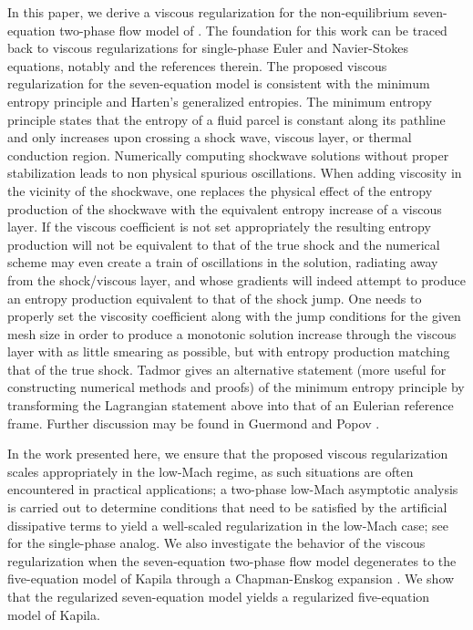 In this paper, we derive a viscous regularization for the non-equilibrium seven-equation two-phase flow model of \cite{SEM}. The foundation for this work 
can be traced back to viscous regularizations for single-phase Euler and Navier-Stokes equations, notably \cite{jlg} and the references therein. 
The proposed viscous regularization for the seven-equation model is consistent with the minimum entropy principle and Harten's generalized 
entropies. 
The minimum entropy principle states that the entropy of a fluid parcel is constant along its pathline
and only increases upon crossing a shock wave, viscous layer, or thermal conduction region.  Numerically computing 
shockwave solutions without proper stabilization leads to non physical spurious oscillations. When adding viscosity in the vicinity 
of the shockwave, one replaces the physical effect of the entropy production of the shockwave with the equivalent entropy increase of a viscous layer.  
If the viscous coefficient is not set appropriately 
the resulting entropy production will not be equivalent to that of the true shock and the numerical scheme %
may even create a train of 
oscillations in the solution, radiating away from the shock/viscous layer, and whose gradients will indeed attempt to produce an entropy production equivalent 
to that of the shock jump. One needs to properly set the viscosity coefficient along with the jump conditions for the given mesh size in order 
to produce a monotonic solution increase through the viscous layer with as little smearing as possible, but with entropy production matching that of the true shock.
Tadmor \cite{tadmor_minimum_entropy_principle} gives an alternative statement (more useful for constructing numerical methods and proofs) of the minimum 
entropy principle by transforming the Lagrangian statement above into that of an Eulerian reference frame. Further discussion may be found in Guermond and Popov \cite{jlg}.

In the work presented here, we ensure that the proposed viscous regularization scales appropriately in the low-Mach regime, as such situations are often encountered 
in practical applications; a two-phase low-Mach asymptotic analysis is carried out to determine conditions that need to be satisfied by the artificial dissipative 
terms to yield a well-scaled regularization in the low-Mach case; see \cite{Marco_paper_low_mach} for the single-phase analog. 
We also investigate the behavior of the viscous regularization when the seven-equation two-phase flow model degenerates to the five-equation 
model of Kapila \cite{Kapila_2001} through a Chapman-Enskog expansion \cite{dellacherie,GuillardMurrone2003}. We show 
that the regularized seven-equation model yields a regularized five-equation model of Kapila.

